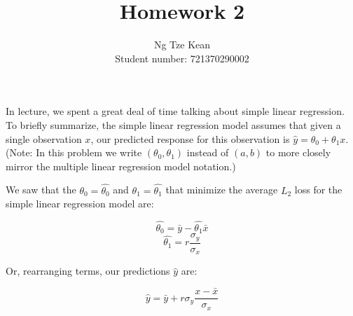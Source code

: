 \documentclass[addpoints, 12pt]{exam}
\title{Homework 2}
\author{Ng Tze Kean\\Student number: 721370290002}
\theoremstyle{definition}
\newtheorem*{answer}{Answer}
\begin{document}
\maketitle

\begin{titlepage}
\end{titlepage}


\newcommand{\homework}{2}
\lecture{Homework \#\homework{}}{}{Due Date: \duedate{}}{}



\begin{questions}

\vspace{-1em}

\question[4] In lecture, we spent a great deal of time talking about  simple linear regression. To briefly summarize, the simple linear regression model assumes that given a single observation $x$, our predicted response for this observation is $\hat{y} = \theta_0 + \theta_1x$. {\small (Note: In this problem we write $(\theta_0, \theta_1)$ instead of $(a, b)$ to more closely mirror the multiple linear regression model notation.)}

We saw that the $\theta_0 = \hat{\theta_0}$ and $\theta_1 = \hat{\theta_1}$ that minimize the average $L_2$ loss for the simple linear regression model are:

\[\hat{\theta_0} = \bar{y} - \hat{\theta_1}\bar{x}\]
$$\hat{\theta_1} = r\frac{\sigma_y}{\sigma_x}$$

Or, rearranging terms, our predictions $\hat{y}$ are:

$$\hat{y} = \bar{y} + r \sigma_y \frac{x - \bar{x}}{\sigma_x}$$

\end{questions}
\end{document}
